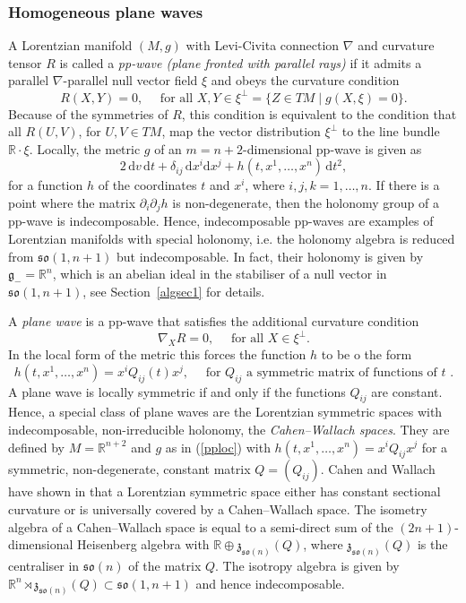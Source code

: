 \documentclass[11pt,a4paper]{amsart}
\newcommand{\g}{\mathfrak{g}}
\newcommand{\z}{\mathfrak{z}}
\newcommand{\+}{\oplus}
\newcommand{\so}{\mathfrak{so}}
\newcommand{\1}{\mathbf{1}}
\renewcommand{\d}{\mathrm{d}}
\newcommand{\R}{\mathbb{R}} %
\newcommand{\<}{\langle}
\renewcommand{\>}{\rangle}
\theoremstyle{definition}
\theoremstyle{plain}
\numberwithin{equation}{section}
\begin{document}
\subsubsection{Homogeneous plane waves}
\label{homplanesec}
A Lorentzian manifold $(M,g)$ with Levi-Civita connection $\nabla$ and curvature tensor $R$ is called a {\em pp-wave (plane fronted with parallel rays)} if it admits a parallel $\nabla$-parallel null vector field $\xi$ and obeys the curvature condition
\begin{equation}
\label{ppcurv}
R(X,Y)=0,\quad\text{ for all }X,Y\in \xi^\perp=\{Z \in TM\mid g(X,\xi)=0\}.\end{equation}
Because of the symmetries of $R$, this condition is equivalent to the condition that all $R(U,V)$, for $U,V\in TM$, map the vector distribution $\xi^\perp$ to the line bundle $\R\cdot \xi$. Locally, the metric $g$ of an $m=n+2$-dimensional  pp-wave is given as
\begin{equation}\label{pploc}
2\,\d v\, \d t +\delta_{ij}\, \d x^i \d x^j+ h(t,x^1,\ldots, x^n)\, \d t^2 ,\end{equation}
for a function $h$ of the coordinates $t$ and $x^i$, where $i,j,k=1, \ldots, n$. If there is a point where the matrix $\partial_i\partial_j h$ is non-degenerate, then the holonomy group of a pp-wave is indecomposable. Hence, indecomposable pp-waves are examples of Lorentzian manifolds with special holonomy, i.e. the holonomy algebra is reduced from $\so(1,n+1)$ but indecomposable. In fact, their holonomy is given by $\g_-=\R^n$, which is an abelian ideal in the stabiliser of a null vector  in $\so(1,n+1)$, see Section~\ref{algsec1} for details.

A {\em plane wave} is a pp-wave that satisfies the additional curvature condition
\begin{equation}
\label{planecurv}
\nabla_XR=0,\quad\text{ for all }X\in \xi^\perp.\end{equation}
In the local form of the metric this forces the function $h$ to be o the form \begin{equation}
\label{planeloc}
h(t,x^1,\ldots, x^n) =x^iQ_{ij}(t)x^j, \quad\text{ for $Q_{ij}$ a symmetric matrix of functions of  $t$ .}\end{equation}
A plane wave is locally symmetric if and only if the functions $Q_{ij}$ are constant.
Hence, a special class of plane waves are the Lorentzian symmetric spaces with indecomposable, non-irreducible holonomy, the {\em Cahen--Wallach spaces}. They are defined by $M=\R^{n+2}$ and $g$ as in (\ref{pploc}) with $h(t,x^1,\ldots, x^n)= x^i Q_{ij} x^j$ for a symmetric, non-degenerate, constant matrix $Q=(Q_{ij})$.  Cahen and Wallach have shown in \cite{cahen-wallach70,Cahen98} that a Lorentzian symmetric space  either has constant sectional curvature or is universally covered by a Cahen--Wallach space.  The isometry algebra of a Cahen--Wallach space is equal to 
a semi-direct sum of the $(2n+1)$-dimensional Heisenberg algebra with $\R\oplus \z_{\so(n)}(Q)$, where $\z_{\so(n)}(Q)$ is the centraliser in $\so(n)$ of the matrix $Q$. The isotropy algebra is given by $\R^n\rtimes  \z_{\so(n)}(Q)\subset \so(1,n+1)$ and hence indecomposable. 
\end{document}
